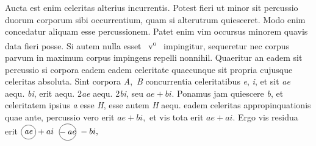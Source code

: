 %
Aucta est enim celeritas alterius incurrentis.%
\protect{}
\pend%
%
\pstart%
Potest fieri ut minor sit percussio%
\protect{}
duorum corporum sibi occurrentium,%
\protect{}%
\protect{}
quam si alterutrum quiesceret.
Modo enim concedatur
aliquam esse percussionem.%
\protect{}
Patet enim
vim occursus minorem quavis data%
\protect{}
fieri posse.
Si autem nulla esset
%
%
~v\textsuperscript{o}\rbrack\    %
%
impingitur,%
\protect{}
sequeretur
nec corpus parvum
in maximum corpus
impingens%
\protect{}
repelli nonnihil.%
\protect{}
\pend%
%
\pstart%
Quaeritur
an eadem sit percussio
si corpora eadem
eadem celeritate
%
%
quaecunque sit
%
%
propria cujusque celeritas absoluta.%
\protect{}
Sint corpora \textit{A},\,%
\textit{B} concurrentia%
\protect{}
celeritatibus \textit{e}, \textit{i},%
\protect{}
et sit \textit{ae} aequ. \textit{bi},
erit
%
%
aequ. 2\textit{ae}
aequ. 2\textit{bi},
seu $ae+bi.$
Ponamus jam quiescere \textit{b},
et celeritatem ipsius \textit{a} esse \textit{H},
esse autem \textit{H} aequ.
%
%
eadem celeritas appropinquationis%
\protect{}
quae ante,
percussio vero erit $ae+bi,$
et vis tota erit $ae+ai.$%
\protect{}
Ergo vis residua%
\protect{}
erit
$\raisebox{-2.25mm}{{\def\firstcircle{(0,0) circle (0.3cm)}\begin{tikzpicture}\draw \firstcircle node {\textit{ae}};\end{tikzpicture}}} + ai \ \raisebox{-2.75mm}{{\def\firstcircle{(0,0) circle (0.35cm)}\begin{tikzpicture}\draw \firstcircle node {$-$\,\textit{ae}};\end{tikzpicture}}} - bi,$
